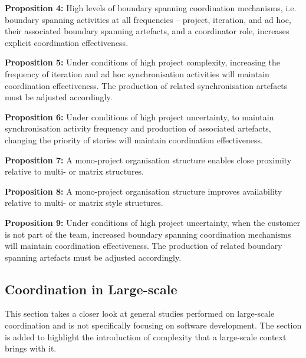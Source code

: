\begin{fancyquotes}
\textbf{Proposition 4:} High levels of boundary spanning coordination mechanisms, i.e. boundary spanning activities at all frequencies – project, iteration, and ad hoc, their associated boundary spanning artefacts, and a coordinator role, increases explicit coordination effectiveness.
\end{fancyquotes}

\begin{fancyquotes}
\textbf{Proposition 5:} Under conditions of high project complexity, increasing the frequency of iteration and ad hoc synchronisation activities will maintain coordination effectiveness. The production of related synchronisation artefacts must be adjusted accordingly.
\end{fancyquotes}

\begin{fancyquotes}
\textbf{Proposition 6:} Under conditions of high project uncertainty, to maintain synchronisation activity frequency and production of associated artefacts, changing the priority of stories will maintain coordination effectiveness.
\end{fancyquotes}

\begin{fancyquotes}
\textbf{Proposition 7:} A mono-project organisation structure enables close proximity relative to multi- or matrix structures.
\end{fancyquotes}

\begin{fancyquotes}
\textbf{Proposition 8:} A mono-project organisation structure improves availability relative to multi- or matrix style structures.
\end{fancyquotes}

\begin{fancyquotes}
\textbf{Proposition 9:} Under conditions of high project uncertainty, when the customer is not part of the team, increased boundary spanning coordination mechanisms will maintain coordination effectiveness. The production of related boundary spanning artefacts must be adjusted accordingly.
\end{fancyquotes}

\subsection{Coordination in Large-scale}
\label{largescalecor}

This section takes a closer look at general studies performed on large-scale coordination and is not specifically focusing on software development. The section is added to highlight the introduction of complexity that a large-scale context brings with it.

